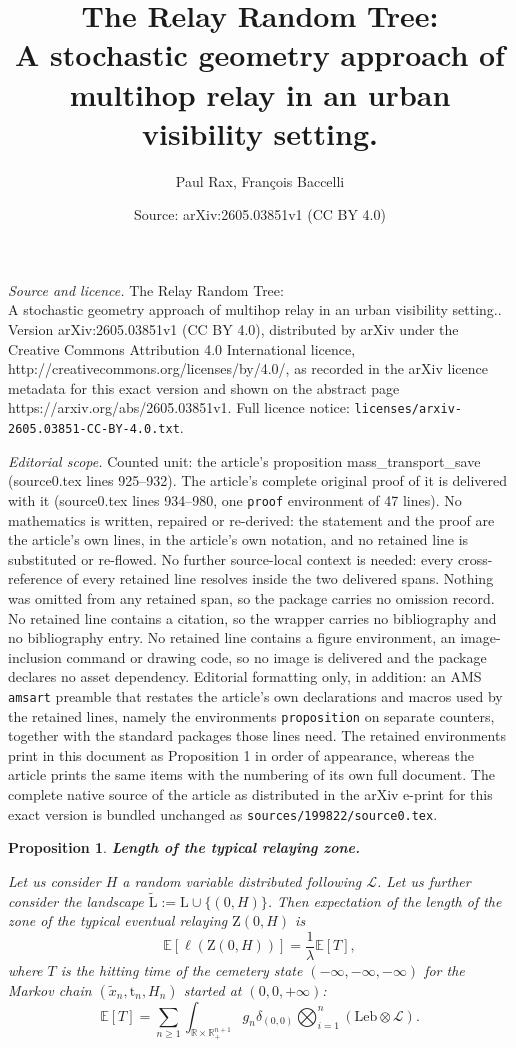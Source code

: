 \documentclass[10pt,a4paper]{amsart}
\title{The Relay Random Tree:\\A stochastic geometry approach of multihop relay in an urban visibility setting.}
\author{Paul Rax, Fran\c{c}ois Baccelli}
\date{Source: arXiv:2605.03851v1 (CC BY 4.0)}
\newtheorem{proposition}{Proposition}
\newcommand{\Half}{\R \times \R_+}
\newcommand{\Leb}{\mathrm{Leb}}
\newcommand{\R}{\mathbb{R}}
\newcommand{\e}{\mathbb{E}}
\newcommand{\landsc}{\mathrm{L}}
\newcommand{\zone}{\mathrm{Z}}
\begin{document}
\maketitle

\noindent\emph{Source and licence.} The Relay Random Tree:\\A stochastic geometry approach of multihop relay in an urban visibility setting.. Version arXiv:2605.03851v1 (CC BY 4.0), distributed by arXiv under the Creative Commons Attribution 4.0 International licence, http://creativecommons.org/licenses/by/4.0/, as recorded in the arXiv licence metadata for this exact version and shown on the abstract page https://arxiv.org/abs/2605.03851v1. Full licence notice: \texttt{licenses/arxiv-2605.03851-CC-BY-4.0.txt}.\par\smallskip

\noindent\textit{Editorial scope.} Counted unit: the article's proposition mass\_transport\_save (source0.tex lines 925--932). The article's complete original proof of it is delivered with it (source0.tex lines 934--980, one \texttt{proof} environment of 47 lines). No mathematics is written, repaired or re-derived: the statement and the proof are the article's own lines, in the article's own notation, and no retained line is substituted or re-flowed.  No further source-local context is needed: every cross-reference of every retained line resolves inside the two delivered spans.  Nothing was omitted from any retained span, so the package carries no omission record.  No retained line contains a citation, so the wrapper carries no bibliography and no bibliography entry.  No retained line contains a figure environment, an image-inclusion command or drawing code, so no image is delivered and the package declares no asset dependency.  Editorial formatting only, in addition: an AMS \texttt{amsart} preamble that restates the article's own declarations and macros used by the retained lines, namely the environments \texttt{proposition} on separate counters, together with the standard packages those lines need.  The retained environments print in this document as Proposition 1 in order of appearance, whereas the article prints the same items with the numbering of its own full document.  The complete native source of the article as distributed in the arXiv e-print for this exact version is bundled unchanged as \texttt{sources/199822/source0.tex}.
\begin{proposition}\label{mass_transport_save}\textbf{Length of the typical relaying zone.}

Let us consider $H$ a random variable distributed following $\mathcal{L}$. Let us further consider the landscape $\tilde{\landsc} := \landsc\cup \{(0, H)\}$. Then expectation of the length of the zone of the typical eventual relaying $\zone (0, H)$ is 
\[\e[\ell(\zone(0, H))] = \frac{1}{\lambda}\e[T],\]
where $T$ is the hitting time of the cemetery state $(-\infty, -\infty, -\infty)$ for the Markov chain $(\tilde{x}_n, \mathrm{t}_n, H_n)$ started at 
$(0, 0, +\infty)$:
\[\e[T] = \sum_{n\geq 1} \displaystyle\int_{\Half^{n+1}} g_n \delta_{(0, 0)}\displaystyle\bigotimes_{i=1}^{n} (\Leb \otimes \mathcal{L}).\]
\end{proposition}
\end{document}

